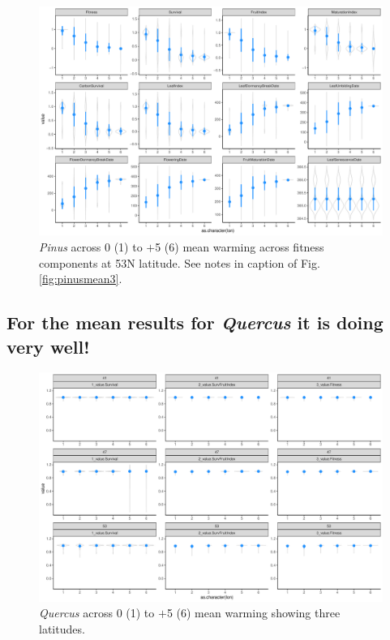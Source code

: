 \documentclass[11pt,letter]{article}
\begin{document}
\begin{figure} 
 \begin{center}
\noindent \includegraphics[width=1\textwidth]{..//analyses/graphs/phenofit/sims/meansim53_allmetricsPS.pdf}
  \caption{\emph{Pinus} across 0 (1) to $+$5 (6) mean warming across fitness components at 53\degree N latitude. See notes in caption of Fig. \ref{fig:pinusmean3}.}
  \label{fig:pinusmean53}
  \end{center}
\end{figure}

\clearpage

\subsection{For the mean results for \emph{Quercus} it is doing very well!}

\begin{figure} 
 \begin{center}
\noindent \includegraphics[width=1\textwidth]{..//analyses/graphs/phenofit/sims/metrics3/meansim_3metricsQR.pdf}
  \caption{\emph{Quercus} across 0 (1) to $+$5 (6) mean warming showing three latitudes.}
  \label{fig:quercusmean3}
  \end{center}
\end{figure}
\end{document}
